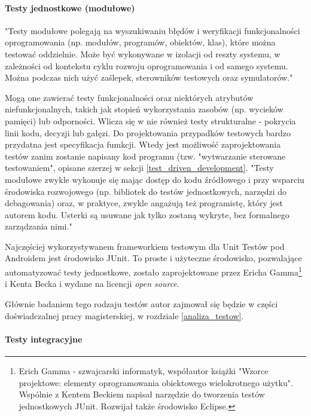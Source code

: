\paragraph{Testy jednostkowe (modułowe)}


"Testy modułowe polegają na wyszukiwaniu błędów i weryfikacji funkcjonalności oprogramowania (np. modułów, programów, obiektów, klas), które można testować
oddzielnie. Może być wykonywane w izolacji od reszty systemu, w zależności od kontekstu cyklu rozwoju oprogramowania i od samego systemu. Można podczas nich użyć zaślepek, sterowników testowych oraz symulatorów." \cite{bib:sylabus:foundation}

Mogą one zawierać testy funkcjonalności oraz niektórych atrybutów niefunkcjonalnych, takich jak stopień wykorzystania zasobów (np. wycieków pamięci) lub odporności. Wlicza się w nie również testy strukturalne - pokrycia linii kodu, decyzji lub gałęzi. Do projektowania przypadków testowych bardzo przydatna jest specyfikacja fumkcji. Wtedy jest możliwość zaprojektowania testów zanim zostanie napisany kod programu (tzw. "wytwarzanie sterowane testowaniem", opisane szerzej w sekcji \ref{test_driven_development}. "Testy modułowe zwykle wykonuje się mając dostęp do kodu źródłowego i przy wsparciu środowiska rozwojowego (np. bibliotek do testów jednostkowych, narzędzi do debagowania) oraz, w praktyce, zwykle angażują też programistę, który jest autorem kodu. Usterki są usuwane jak tylko zostaną wykryte, bez formalnego zarządzania nimi."   \cite{bib:sylabus:foundation}

Najczęściej wykorzystywanem frameworkiem testowym dla Unit Testów pod Androidem jest środowisko JUnit. To proste i użyteczne środowisko, pozwalające automatyzować testy jednostkowe, zostało zaprojektowane przez Ericha Gamma\footnote{Erich Gamma - szwajcarski informatyk, współautor książki "Wzorce projektowe: elementy oprogramowania obiektowego wielokrotnego użytku". Wspólnie z Kentem Beckiem napisał narzędzie do tworzenia testów jednostkowych JUnit. Rozwijał także środowisko Eclipse.} i Kenta Becka i wydane na licencji \textit{open source}.

Głównie badaniem tego rodzaju testów autor zajmował się będzie w części doświadczalnej pracy magisterskiej, w rozdziale \ref{analiza_testow}.

\paragraph{Testy integracyjne}

